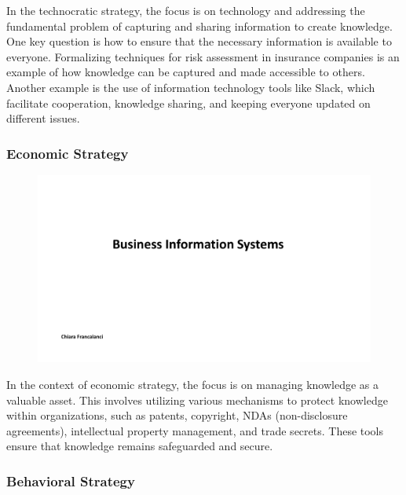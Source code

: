In the technocratic strategy, the focus is on technology and addressing
the fundamental problem of capturing and sharing information to create
knowledge. One key question is how to ensure that the necessary
information is available to everyone. Formalizing techniques for risk
assessment in insurance companies is an example of how knowledge can be
captured and made accessible to others. Another example is the use of
information technology tools like Slack, which facilitate cooperation,
knowledge sharing, and keeping everyone updated on different issues.

\subsubsection{Economic Strategy}\label{economic-strategy}

\begin{figure}[!h]
    \centering
    \includegraphics[page=11, trim = 1.5cm 2.8cm 1.5cm 4.5cm, clip, width=\textwidth]{images/05 - KM.pdf}
\end{figure}

In the context of economic strategy, the focus is on managing knowledge
as a valuable asset. This involves utilizing various mechanisms to
protect knowledge within organizations, such as patents, copyright, NDAs
(non-disclosure agreements), intellectual property management, and trade
secrets. These tools ensure that knowledge remains safeguarded and
secure.

\subsubsection{Behavioral Strategy}\label{behavioral-strategy}

